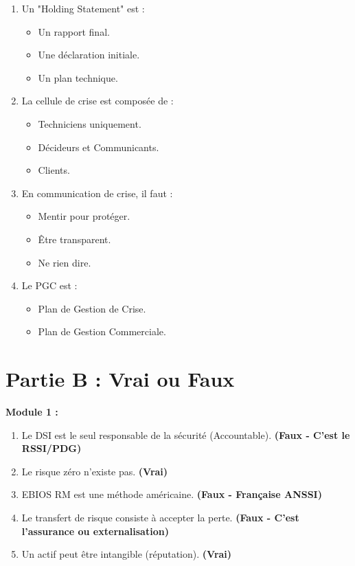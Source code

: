 \begin{enumerate}
    \item Un "Holding Statement" est :
    \begin{itemize} \item[A.] Un rapport final. \item[B.] Une déclaration initiale. \item[C.] Un plan technique. \end{itemize}
    \item La cellule de crise est composée de :
    \begin{itemize} \item[A.] Techniciens uniquement. \item[B.] Décideurs et Communicants. \item[C.] Clients. \end{itemize}
    \item En communication de crise, il faut :
    \begin{itemize} \item[A.] Mentir pour protéger. \item[B.] Être transparent. \item[C.] Ne rien dire. \end{itemize}
    \item Le PGC est :
    \begin{itemize} \item[A.] Plan de Gestion de Crise. \item[B.] Plan de Gestion Commerciale. \end{itemize}
\end{enumerate}

\section{Partie B : Vrai ou Faux}

\textbf{Module 1 :}
\begin{enumerate}
    \item Le DSI est le seul responsable de la sécurité (Accountable). \textbf{(Faux - C'est le RSSI/PDG)}
    \item Le risque zéro n'existe pas. \textbf{(Vrai)}
    \item EBIOS RM est une méthode américaine. \textbf{(Faux - Française ANSSI)}
    \item Le transfert de risque consiste à accepter la perte. \textbf{(Faux - C'est l'assurance ou externalisation)}
    \item Un actif peut être intangible (réputation). \textbf{(Vrai)}
\end{enumerate}

